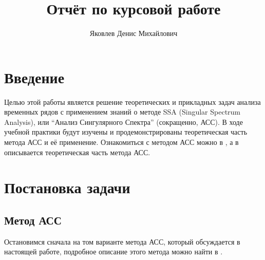 \documentclass[specialist,
substylefile = spbu_report.rtx,
subf,href,colorlinks=true, 12pt]{disser}
\begin{document}
	
	
	\title{Отчёт по курсовой работе}
	
	
	\author{Яковлев Денис Михайлович}
	
	
	\date{\number\year}
	
	\maketitle
	\tableofcontents
	\section{Введение}
	Целью этой работы является решение теоретических и прикладных задач анализа временных рядов с применением знаний о методе SSA (Singular Spectrum Analysis), или ``Анализ Сингулярного Спектра'' (сокращенно, АСС). В ходе учебной практики будут изучены и продемонстрированы теоретическая часть метода АСС и её применение. Ознакомиться с методом АСС можно в \cite{GNZh01}, а в  \cite{Nekrutkin10} описывается теоретическая часть метода АСС.
	
	\section{Постановка задачи}
	
	\subsection{Метод АСС}
	\label{ssect:SSA}
	Остановимся сначала на том варианте метода АСС, который обсуждается в настоящей работе,  подробное
	описание этого  метода
	можно найти в \cite{GNZh01}.
	
\end{document}
